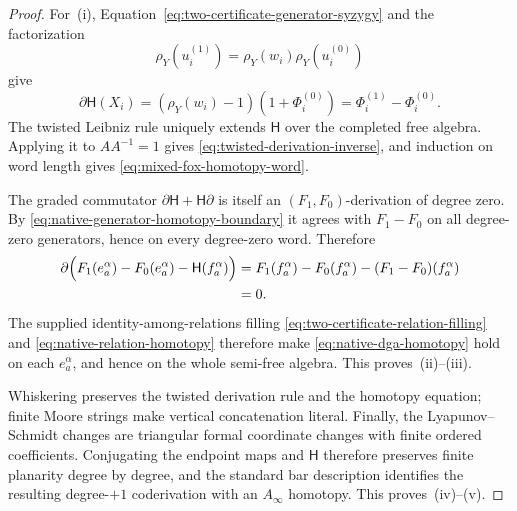 \documentclass[11pt]{article}
\theoremstyle{definition}
\begin{document}
\begin{proof}
For~(i), Equation~\eqref{eq:two-certificate-generator-syzygy} and the factorization
\[
 \rho_Y(u_i^{(1)})
 =\rho_Y(w_i)\rho_Y(u_i^{(0)})
\]
give
\[
 \partial\mathsf H(X_i)
 =(\rho_Y(w_i)-1)(1+\Phi_i^{(0)})
 =\Phi_i^{(1)}-\Phi_i^{(0)}.
\]
The twisted Leibniz rule uniquely extends $\mathsf H$ over the completed free
algebra.  Applying it to $AA^{-1}=1$ gives
\eqref{eq:twisted-derivation-inverse}, and induction on word length gives
\eqref{eq:mixed-fox-homotopy-word}.

The graded commutator $\partial\mathsf H+\mathsf H\partial$ is itself an
$(F_1,F_0)$-derivation of degree zero.  By
\eqref{eq:native-generator-homotopy-boundary} it agrees with $F_1-F_0$ on all
degree-zero generators, hence on every degree-zero word.  Therefore
\begin{align*}
 \partial\Bigl(
 F_1(e_a^\alpha)-F_0(e_a^\alpha)
 -\mathsf H(f_a^\alpha)
 \Bigr)
 &=F_1(f_a^\alpha)-F_0(f_a^\alpha)
   -(F_1-F_0)(f_a^\alpha)\\
 &=0.
\end{align*}
The supplied identity-among-relations filling
\eqref{eq:two-certificate-relation-filling} and
\eqref{eq:native-relation-homotopy} therefore make
\eqref{eq:native-dga-homotopy} hold on each $e_a^\alpha$, and hence on the
whole semi-free algebra.  This proves~(ii)--(iii).

Whiskering preserves the twisted derivation rule and the homotopy equation;
finite Moore strings make vertical concatenation literal.  Finally, the
Lyapunov--Schmidt changes are triangular formal coordinate changes with
finite ordered coefficients.  Conjugating the endpoint maps and
$\mathsf H$ therefore preserves finite planarity degree by degree, and the
standard bar description identifies the resulting degree-$+1$ coderivation
with an $A_\infty$ homotopy.  This proves~(iv)--(v).
\end{proof}
\end{document}
